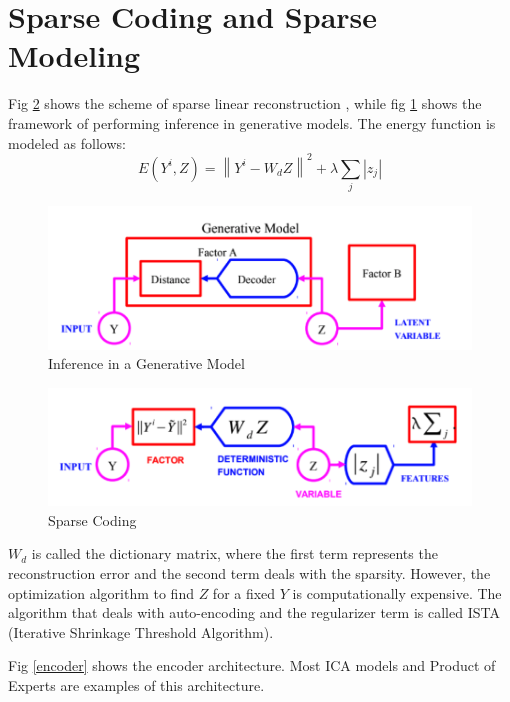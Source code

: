 \section*{Sparse Coding and Sparse Modeling}

Fig \ref{fig:sparse} shows the scheme of sparse linear reconstruction \cite{olshausen1997sparse}, while fig \ref{fig:generative} shows the framework of performing inference in generative models.
The energy function is modeled as follows:
\[E\left(Y^{i}, Z\right)=\left\|Y^{i}-W_{d} Z\right\|^{2}+\lambda \sum_{j}\left|z_{j}\right|\]
\begin{figure}[H]
\centering
\includegraphics[width=1.0\linewidth]{figs/generative.png}
\caption{Inference in a Generative Model}
\label{fig:generative}
\end{figure}

\begin{figure}[H]
\centering
\includegraphics[width=1.0\linewidth]{figs/sparse.png}
\caption{Sparse Coding}
\label{fig:sparse}
\end{figure}
$W_d$ is called the dictionary matrix, where the first term represents the reconstruction error and the second term deals with the sparsity. However, the optimization algorithm to find $Z$ for a fixed $Y$ is computationally expensive. The algorithm that deals with auto-encoding and the regularizer term is called ISTA (Iterative Shrinkage Threshold Algorithm). 

Fig \ref{encoder} shows the encoder architecture. Most ICA models and Product of Experts are examples of this architecture.

